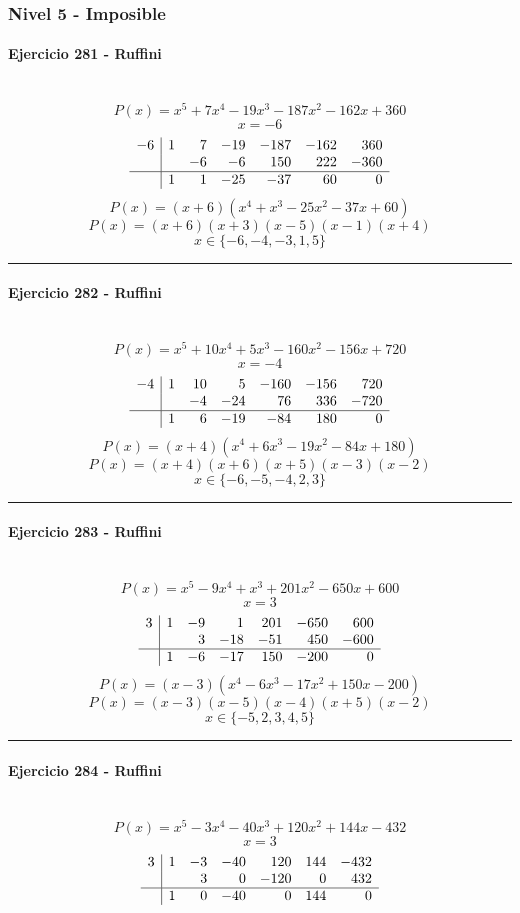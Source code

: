 \documentclass[10pt,a4paper]{article}
\newcommand{\res}[1]{\paragraph{#1}\mbox{}\\[-1.2em]}
\begin{document}
\subsubsection*{Nivel 5 - Imposible}
\res{Ejercicio 281 - Ruffini}
\[ P(x)=x^{5} + 7 x^{4} - 19 x^{3} - 187 x^{2} - 162 x + 360 \]
\[ x=-6 \]
\[\begin{array}{r|rrrrrr}-6 & 1 & 7 & -19 & -187 & -162 & 360\\  &  & -6 & -6 & 150 & 222 & -360\\\hline  & 1 & 1 & -25 & -37 & 60 & 0\end{array}\]
\[ P(x)=(x+6)(x^{4} + x^{3} - 25 x^{2} - 37 x + 60) \]
\[ P(x)=(x+6)(x+3)(x-5)(x-1)(x+4) \]
\[ \boxed{x\in\{-6,-4,-3,1,5\}} \]
\vspace{1mm}\hrule\vspace{2mm}
\res{Ejercicio 282 - Ruffini}
\[ P(x)=x^{5} + 10 x^{4} + 5 x^{3} - 160 x^{2} - 156 x + 720 \]
\[ x=-4 \]
\[\begin{array}{r|rrrrrr}-4 & 1 & 10 & 5 & -160 & -156 & 720\\  &  & -4 & -24 & 76 & 336 & -720\\\hline  & 1 & 6 & -19 & -84 & 180 & 0\end{array}\]
\[ P(x)=(x+4)(x^{4} + 6 x^{3} - 19 x^{2} - 84 x + 180) \]
\[ P(x)=(x+4)(x+6)(x+5)(x-3)(x-2) \]
\[ \boxed{x\in\{-6,-5,-4,2,3\}} \]
\vspace{1mm}\hrule\vspace{2mm}
\res{Ejercicio 283 - Ruffini}
\[ P(x)=x^{5} - 9 x^{4} + x^{3} + 201 x^{2} - 650 x + 600 \]
\[ x=3 \]
\[\begin{array}{r|rrrrrr}3 & 1 & -9 & 1 & 201 & -650 & 600\\  &  & 3 & -18 & -51 & 450 & -600\\\hline  & 1 & -6 & -17 & 150 & -200 & 0\end{array}\]
\[ P(x)=(x-3)(x^{4} - 6 x^{3} - 17 x^{2} + 150 x - 200) \]
\[ P(x)=(x-3)(x-5)(x-4)(x+5)(x-2) \]
\[ \boxed{x\in\{-5,2,3,4,5\}} \]
\vspace{1mm}\hrule\vspace{2mm}
\res{Ejercicio 284 - Ruffini}
\[ P(x)=x^{5} - 3 x^{4} - 40 x^{3} + 120 x^{2} + 144 x - 432 \]
\[ x=3 \]
\[\begin{array}{r|rrrrrr}3 & 1 & -3 & -40 & 120 & 144 & -432\\  &  & 3 & 0 & -120 & 0 & 432\\\hline  & 1 & 0 & -40 & 0 & 144 & 0\end{array}\]
\end{document}
